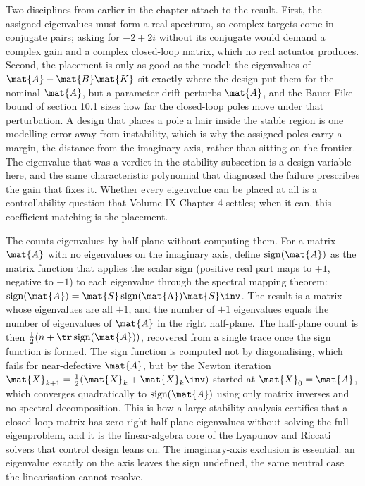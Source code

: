 Two disciplines from earlier in the chapter attach to the result.
First, the assigned eigenvalues must form a real spectrum, so complex
targets come in conjugate pairs; asking for $-2 + 2i$ without its
conjugate would demand a complex gain and a complex closed-loop matrix,
which no real actuator produces. Second, the placement is only as good
as the model: the eigenvalues of $\mat{A} - \mat{B}\mat{K}$ sit exactly
where the design put them for the nominal $\mat{A}$, but a parameter
drift perturbs $\mat{A}$, and the Bauer-Fike bound of section 10.1
sizes how far the closed-loop poles move under that perturbation. A
design that places a pole a hair inside the stable region is one
modelling error away from instability, which is why the assigned poles
carry a margin, the distance from the imaginary axis, rather than
sitting on the frontier. The eigenvalue that was a verdict in the
stability subsection is a design variable here, and the same
characteristic polynomial that diagnosed the failure prescribes the
gain that fixes it. Whether every eigenvalue can be placed at all is a
controllability question that Volume IX Chapter 4 settles; when it can,
this coefficient-matching is the placement.

\begin{mastery}
The  counts eigenvalues by half-plane
without computing them. For a matrix $\mat{A}$ with no eigenvalues on
the imaginary axis, define $\operatorname{sign}(\mat{A})$ as the matrix
function that applies the scalar sign (positive real part maps to $+1$,
negative to $-1$) to each eigenvalue through the spectral mapping
theorem: $\operatorname{sign}(\mat{A}) = \mat{S}\operatorname{sign}
(\mat{\Lambda})\mat{S}\inv$. The result is a matrix whose eigenvalues
are all $\pm 1$, and the number of $+1$ eigenvalues equals the number
of eigenvalues of $\mat{A}$ in the right half-plane. The half-plane
count is then $\tfrac{1}{2}(n + \tr\operatorname{sign}(\mat{A}))$,
recovered from a single trace once the sign function is formed. The
sign function is computed not by diagonalising, which fails for
near-defective $\mat{A}$, but by the Newton iteration $\mat{X}_{k+1} =
\tfrac{1}{2}(\mat{X}_{k} + \mat{X}_{k}\inv)$ started at $\mat{X}_{0} =
\mat{A}$, which converges quadratically to $\operatorname{sign}
(\mat{A})$ using only matrix inverses and no spectral decomposition.
This is how a large stability analysis certifies that a closed-loop
matrix has zero right-half-plane eigenvalues without solving the full
eigenproblem, and it is the linear-algebra core of the Lyapunov and
Riccati solvers that control design leans on. The imaginary-axis
exclusion is essential: an eigenvalue exactly on the axis leaves the
sign undefined, the same neutral case the linearisation cannot resolve.
\end{mastery}

